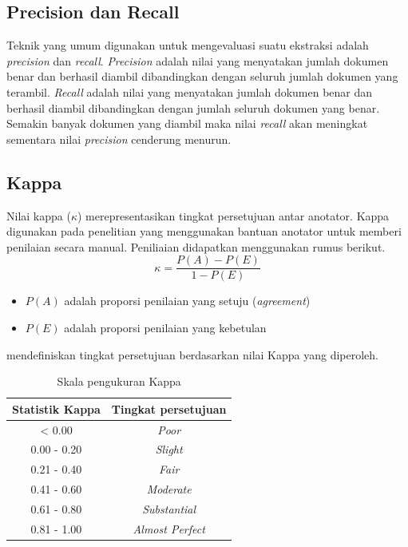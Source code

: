 \subsection{Precision dan Recall}
Teknik yang umum digunakan untuk mengevaluasi suatu ekstraksi adalah \textit{precision} dan \textit{recall}. \textit{Precision} adalah nilai yang menyatakan jumlah dokumen benar dan berhasil diambil dibandingkan dengan seluruh jumlah dokumen yang terambil. \textit{Recall} adalah nilai yang menyatakan jumlah dokumen benar dan berhasil diambil dibandingkan dengan jumlah seluruh dokumen yang benar. Semakin banyak dokumen yang diambil maka nilai \textit{recall} akan meningkat sementara nilai \textit{precision} cenderung menurun. 

\subsection{Kappa}
Nilai kappa ($\kappa$) merepresentasikan tingkat persetujuan antar anotator. Kappa digunakan pada penelitian yang menggunakan bantuan anotator untuk memberi penilaian secara manual. Peniliaian didapatkan menggunakan rumus berikut.
\[ \kappa=\frac{P(A)-P(E)}{1-P(E)} \]
\begin{itemize}
  \item $P(A)$ adalah proporsi penilaian yang setuju (\textit{agreement})
  \item $P(E)$ adalah proporsi penilaian yang kebetulan
\end{itemize}
\cite{landis1977measurement} mendefiniskan tingkat persetujuan berdasarkan nilai Kappa yang diperoleh. 
\begin{table}
  \centering
    \caption{Skala pengukuran Kappa}
    \label{table:skalaKappa}
    \begin{tabular}{|c|c|}
      \hline
      Statistik Kappa & Tingkat persetujuan \\ \hline
      < 0.00 & \textit{Poor} \\ \hline
      0.00 - 0.20 & \textit{Slight} \\ \hline
      0.21 - 0.40 & \textit{Fair} \\ \hline
      0.41 - 0.60 & \textit{Moderate} \\ \hline
      0.61 - 0.80 & \textit{Substantial} \\ \hline
      0.81 - 1.00 & \textit{Almost Perfect} \\ \hline
    \end{tabular}
\end{table}

